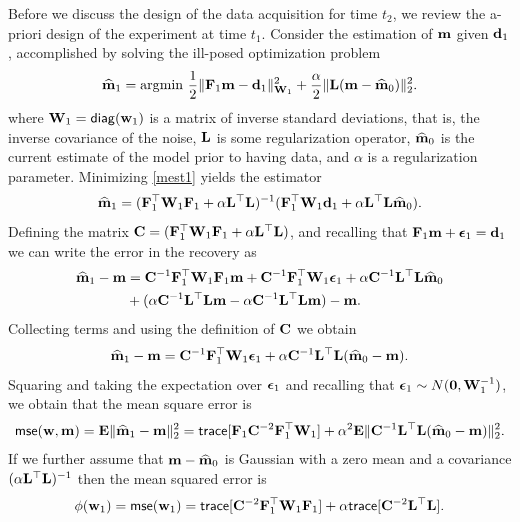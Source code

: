 \documentclass[final,leqno,onefignum,onetabnum]{siamltexmm}
\begin{document}
Before we discuss the design of the data acquisition for time $t_{2}$,
 we review the a-priori design of the experiment at time $t_{1}$.  
Consider  the estimation of ${\bf{m}}$ given ${\bf{d}}_{1}$,  accomplished by solving the ill-posed optimization problem
%
\begin{align}
\label{mest1}
\widehat \bfm_{1} = {\rm arg}{\min} \ \hf \| \bfF_{1} \bfm - \bfd_{1}\|^{2}_{\bfW_{1}} + {\frac {\alpha} 2}
\|\bfL (\bfm - \bfmhat_{0}) \|^{2}_2. 
\end{align}
%
where ${\bf{W}}_{1} = {\sf diag}({\bf{w}}_{1})$ is a matrix of inverse standard deviations, 
that is, the inverse covariance of the noise, ${\bf{L}}$ is some regularization operator, ${\widehat{{\bf{m}}}}_{0}$ is
the current estimate of the model prior to having data, and $\alpha$ is a regularization parameter.
Minimizing \eqref{mest1} yields the estimator
%
\begin{align}
\label{mest}
\widehat \bfm_{1} = (\bfF_{1}^{\top} \bfW_{1}\bfF_{1} + \alpha \LtL)^{-1} (\bfF_{1}^{\top} \bfW_{1} \bfd_{1}
+ \alpha \LtL \bfmhat_{0}).
\end{align}
%
Defining the matrix ${\bf{C}} = ({\bf{F}}_{1}^{\top} {\bf{W}}_{1}{\bf{F}}_{1} + \alpha {\bf{L}}^{\top}{\bf{L}})$, and recalling that ${\bf{F}}_1{\bf{m}} + {\boldsymbol \epsilon}_1 = {\bf{d}}_1$ we can write
the error in the recovery as
%
\begin{align}
\label{diffmod}
\bfmhat_1 -\bfm &= \bfC^{-1} \bfF_{1}^{\top} \bfW_{1}\bfF_{1} \bfm + \bfC^{-1} \bfF_{1}^{\top} \bfW_{1}\bfepsilon_1 + \alpha
\bfC^{-1} \LtL \bfmhat_{0} \\
\nonumber
&+ (\alpha \bfC^{-1} \LtL\bfm
- \alpha \bfC^{-1} \LtL \bfm) 
 -\bfm.
\end{align}
%
Collecting terms and using the definition of ${\bf{C}}$ we obtain
%
\begin{align}
{\widehat{{\bf{m}}}}_1 -{\bf{m}} = {\bf{C}}^{-1} {\bf{F}}_{1}^{\top} {\bf{W}}_{1} {\boldsymbol \epsilon}_1 + \alpha {\bf{C}}^{-1} {\bf{L}}^{\top}{\bf{L}} ({\widehat{{\bf{m}}}}_{0} - {\bf{m}}).
\end{align}
%
Squaring and taking the expectation over ${\boldsymbol \epsilon}_1$ and recalling that $ {\boldsymbol \epsilon}_1 \sim N({\bf 0},{\bf{W}}_{1}^{-1})$, we obtain that the mean square error is
%
\begin{align}
{\sf mse}({\bf{w}},{\bf{m}}) = {\bf{E}}\| {\widehat{{\bf{m}}}}_1 -{\bf{m}} \|^{2}_2 = {\sf trace}[   {\bf{F}}_{1} {\bf{C}}^{-2} {\bf{F}}_{1}^{\top} {\bf{W}}_{1}]  + 
\alpha^2 {\bf{E}}\| {\bf{C}}^{-1} {\bf{L}}^{\top}{\bf{L}} ({\widehat{{\bf{m}}}}_{0} - {\bf{m}}) \|^{2}_2.
\end{align}
%
If we further assume that ${\bf{m}}-{\widehat{{\bf{m}}}}_{0}$ is Gaussian with a zero mean and a covariance
$(\alpha {\bf{L}}^{\top}{\bf{L}})^{-1}$ then the mean squared error is 
%
\begin{align}
\phi({\bf{w}}_1 ) = {\sf mse}({\bf{w}}_1) = {\sf trace}[    {\bf{C}}^{-2} {\bf{F}}_{1}^{\top}{\bf{W}}_{1}{\bf{F}}_{1}]  + 
 \alpha {\sf trace} [{\bf{C}}^{-2} {\bf{L}}^{\top}{\bf{L}}]. 
\end{align}
\end{document}
